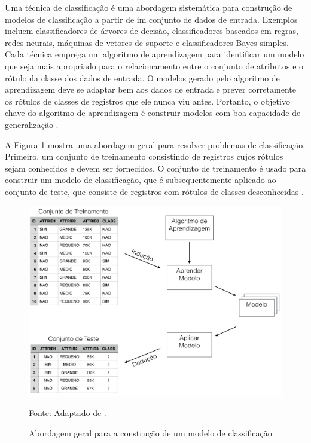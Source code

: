 \documentclass[
	12pt,				%
	openright,			%
	oneside,	
	a4paper,				%
	english,				%
	brazil				%
]{abntex2/abntex2} %
\begin{document}
	Uma técnica de classificação é uma abordagem sistemática para construção de modelos de classificação a partir de im conjunto de dados de entrada. Exemplos incluem classificadores de árvores de decisão, classificadores baseados em regras, redes neurais, máquinas de vetores de suporte e classificadores Bayes simples. Cada técnica emprega um algoritmo de aprendizagem para identificar um modelo que seja mais apropriado para o relacionamento entre o conjunto de atributos e o rótulo da classe dos dados de entrada. O modelos gerado pelo algoritmo de aprendizagem deve se adaptar bem aos dados de entrada e prever corretamente os rótulos de classes de registros que ele nunca viu antes. Portanto, o objetivo chave do algoritmo de aprendizagem é construir modelos com boa capacidade de generalização \cite{tan:2009}.
	
	A Figura \ref{figabordagemModeloClassificacao} mostra uma abordagem geral para resolver problemas de classificação. Primeiro, um conjunto de treinamento consistindo de registros cujos rótulos sejam conhecidos e devem ser fornecidos. O conjunto de treinamento é usado para construir um modelo de classificação, que é subsequentemente aplicado ao conjunto de teste, que consiste de registros com rótulos de classes desconhecidas \cite{tan:2009}.
	\\
	\begin{figure}[!htb]
		\caption{\label{figabordagemModeloClassificacao} Abordagem geral para a construção de um modelo de classificação }
		\begin{center}
			\includegraphics[scale=0.3]{img/abordagemModeloClassificacao.png}
		\end{center}
		Fonte: Adaptado de \cite{tan:2009}.
	\end{figure}
\end{document}
